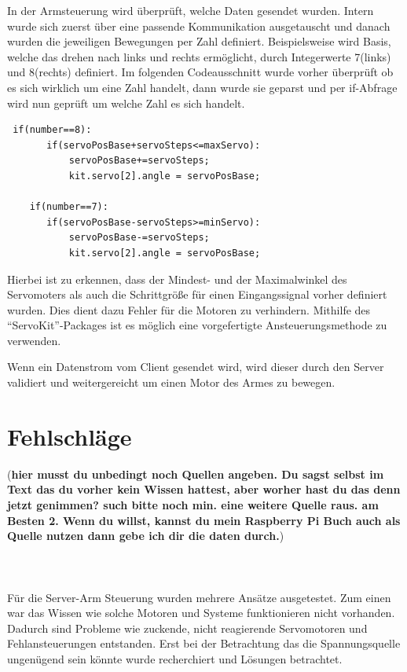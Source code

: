 \documentclass[12pt,					%
							 oneside,			%
							 a4paper,			%
							 halfparskip,		%
							 liststotoc,			%
							 bibtotoc,			%
							 fleqn,				%
							 pointlessnumbers]	%
							 {scrreprt}
\begin{document}
In der Armsteuerung wird überprüft, welche Daten gesendet wurden. Intern wurde sich zuerst über eine passende Kommunikation ausgetauscht und danach wurden die jeweiligen Bewegungen per Zahl definiert. Beispielsweise wird Basis, welche das drehen nach links und rechts ermöglicht, durch Integerwerte 7(links) und 8(rechts) definiert. Im folgenden Codeausschnitt wurde vorher überprüft ob es sich wirklich um eine Zahl handelt, dann wurde sie geparst und per \glqq{}if\grqq{}-Abfrage wird nun geprüft um welche Zahl es sich handelt. 
\newpage
\begin{lstlisting}
 if(number==8):
       if(servoPosBase+servoSteps<=maxServo):           
           servoPosBase+=servoSteps;
           kit.servo[2].angle = servoPosBase;
        
    if(number==7):
       if(servoPosBase-servoSteps>=minServo):           
           servoPosBase-=servoSteps;
           kit.servo[2].angle = servoPosBase;
\end{lstlisting}
Hierbei ist zu erkennen, dass der Mindest- und der Maximalwinkel des Servomoters als auch die Schrittgröße für einen Eingangssignal vorher definiert wurden. Dies dient dazu Fehler für die Motoren zu verhindern.  Mithilfe des ``ServoKit''-Packages ist es möglich eine vorgefertigte Ansteuerungsmethode zu verwenden.


Wenn ein Datenstrom vom Client gesendet wird, wird dieser durch den Server validiert und weitergereicht um einen Motor des Armes zu bewegen.


\chapter{Fehlschläge}
(\textbf{hier musst du unbedingt noch Quellen angeben. Du sagst selbst im Text das du vorher kein Wissen hattest, aber worher hast du das denn jetzt genimmen? such bitte noch min. eine weitere Quelle raus. am Besten 2.  Wenn du willst, kannst du mein Raspberry Pi Buch auch als Quelle nutzen dann gebe ich dir die daten durch.}) \\ \\ \\ \\
Für die Server-Arm Steuerung wurden mehrere Ansätze ausgetestet. Zum einen war das Wissen wie solche Motoren und Systeme funktionieren nicht vorhanden. Dadurch sind Probleme wie zuckende, nicht reagierende Servomotoren und Fehlansteuerungen entstanden. Erst bei der Betrachtung das die Spannungsquelle ungenügend sein könnte wurde recherchiert\cite{I2C} und Lösungen betrachtet. 
\end{document}
